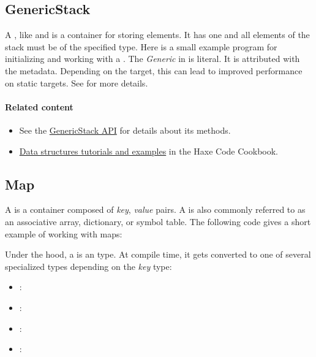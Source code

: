 \subsection{GenericStack}
\label{std-GenericStack}
A , like  and  is a container for storing elements.  It has one  and all elements of the stack must be of the specified type.   Here is a small example program for initializing and working with a .
The \emph{Generic} in  is literal.  It is attributed with the  metadata.  Depending on the target, this can lead to improved performance on static targets.  See  for more details.

\paragraph{Related content}
\begin{itemize}
	\item See the \href{https://api.haxe.org/haxe/ds/GenericStack.html}{GenericStack API} for details about its methods. 
	\item \href{http://code.haxe.org/category/data-structures/}{Data structures tutorials and examples} in the Haxe Code Cookbook.
\end{itemize}

\subsection{Map}
\label{std-Map}

A  is a container composed of \emph{key}, \emph{value} pairs.  A  is also commonly referred to as an associative array, dictionary, or symbol table. The following code gives a short example of working with maps:


Under the hood, a  is an  type. At compile time, it gets converted to one of several specialized types depending on the \emph{key} type:
\begin{itemize}
	\item {}: 
	\item {}: 
	\item {}: 
	\item \type{\{\}}: 
\end{itemize}

